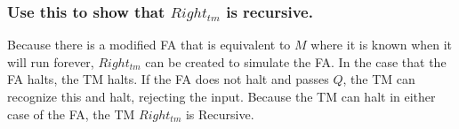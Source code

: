 \documentclass[12pt, a4paper]{article}
\begin{document}
\subsubsection{Use this to show that $Right_{tm}$ is recursive.}
Because there is a modified FA that is equivalent to $M$ where it is known when it will run forever, $Right_{tm}$ can be created to simulate the FA. In the case that the FA halts, the TM halts. If the FA does not halt and passes $Q$, the TM can recognize this and halt, rejecting the input. Because the TM can halt in either case of the FA, the TM $Right_{tm}$ is Recursive.
\end{document}

